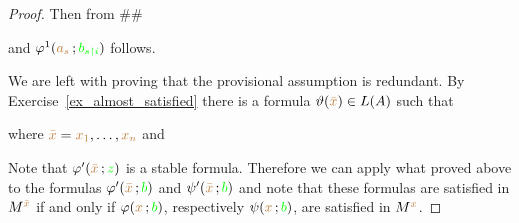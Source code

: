 \begin{proof}
  Then from $\#\#$

  
  and  $\varphi^1({\color{brown} a_s}\,;{\color{green} b_{s\restriction i}})$ follows.

  We are left with proving that the provisional assumption is redundant.
  By Exercise~\ref{ex_almost_satisfied} there is a formula $\vartheta({\color{brown}\bar x})\in L(A)$ such that


  where ${\color{brown}\bar x}={\color{brown} x_1},\dots,{\color{brown} x_n}$ and 



  Note that $\varphi'({\color{brown}\bar x}\,;{\color{green} z})$ is a stable formula.
  Therefore we can apply what proved above to the formulas $\varphi'({\color{brown}\bar x}\,;{\color{green} b})$ and $\psi'({\color{brown}\bar x}\,;{\color{green} b})$ and note that these formulas are satisfied in $M^{\color{brown}\bar x}$ if and only if $\varphi({\color{brown} x}\,;{\color{green} b})$, respectively $\psi({\color{brown} x}\,;{\color{green} b})$, are satisfied in $M^{\color{brown} x}$.
\end{proof}


